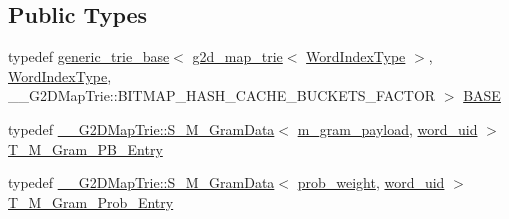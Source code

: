 \subsection*{Public Types}
\begin{DoxyCompactItemize}
\item 
typedef \hyperlink{classuva_1_1smt_1_1bpbd_1_1server_1_1lm_1_1generic__trie__base}{generic\+\_\+trie\+\_\+base}$<$ \hyperlink{classuva_1_1smt_1_1bpbd_1_1server_1_1lm_1_1g2d__map__trie}{g2d\+\_\+map\+\_\+trie}$<$ \hyperlink{classuva_1_1smt_1_1bpbd_1_1server_1_1lm_1_1word__index__trie__base_a64279b5b94c421b25aedaa72e73d013c}{Word\+Index\+Type} $>$, \hyperlink{classuva_1_1smt_1_1bpbd_1_1server_1_1lm_1_1word__index__trie__base_a64279b5b94c421b25aedaa72e73d013c}{Word\+Index\+Type}, \+\_\+\+\_\+\+G2\+D\+Map\+Trie\+::\+B\+I\+T\+M\+A\+P\+\_\+\+H\+A\+S\+H\+\_\+\+C\+A\+C\+H\+E\+\_\+\+B\+U\+C\+K\+E\+T\+S\+\_\+\+F\+A\+C\+T\+O\+R $>$ \hyperlink{classuva_1_1smt_1_1bpbd_1_1server_1_1lm_1_1g2d__map__trie_a2b15dbbb98391a04427bc3d651816654}{B\+A\+S\+E}
\item 
typedef \hyperlink{structuva_1_1smt_1_1bpbd_1_1server_1_1lm_1_1_____g2_d_map_trie_1_1_s___m___gram_data}{\+\_\+\+\_\+\+G2\+D\+Map\+Trie\+::\+S\+\_\+\+M\+\_\+\+Gram\+Data}$<$ \hyperlink{namespaceuva_1_1smt_1_1bpbd_1_1server_1_1lm_1_1m__grams_a1422aa6b3f3cb9377916d20e9bf16c0a}{m\+\_\+gram\+\_\+payload}, \hyperlink{namespaceuva_1_1smt_1_1bpbd_1_1server_a6bfe45ba344d65a7fdd7d26156328ddc}{word\+\_\+uid} $>$ \hyperlink{classuva_1_1smt_1_1bpbd_1_1server_1_1lm_1_1g2d__map__trie_a03f7ddb6d421914955f727c1d5d74cc2}{T\+\_\+\+M\+\_\+\+Gram\+\_\+\+P\+B\+\_\+\+Entry}
\item 
typedef \hyperlink{structuva_1_1smt_1_1bpbd_1_1server_1_1lm_1_1_____g2_d_map_trie_1_1_s___m___gram_data}{\+\_\+\+\_\+\+G2\+D\+Map\+Trie\+::\+S\+\_\+\+M\+\_\+\+Gram\+Data}$<$ \hyperlink{namespaceuva_1_1smt_1_1bpbd_1_1server_a01e9ea4de9c226f4464862e84ff0bbcc}{prob\+\_\+weight}, \hyperlink{namespaceuva_1_1smt_1_1bpbd_1_1server_a6bfe45ba344d65a7fdd7d26156328ddc}{word\+\_\+uid} $>$ \hyperlink{classuva_1_1smt_1_1bpbd_1_1server_1_1lm_1_1g2d__map__trie_aec7f86efc233c482645f988dcf3bb115}{T\+\_\+\+M\+\_\+\+Gram\+\_\+\+Prob\+\_\+\+Entry}
\end{DoxyCompactItemize}
